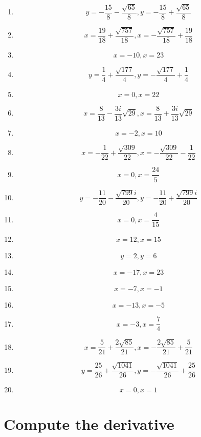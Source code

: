 \documentclass{article}
\begin{document}
        \begin{enumerate}
        \item$$y = - \frac{15}{8} - \frac{\sqrt{65}}{8}, y = - \frac{15}{8} + \frac{\sqrt{65}}{8}$$
\item$$x = \frac{19}{18} + \frac{\sqrt{757}}{18}, x = - \frac{\sqrt{757}}{18} + \frac{19}{18}$$
\item$$x = -10, x = 23$$
\item$$y = \frac{1}{4} + \frac{\sqrt{177}}{4}, y = - \frac{\sqrt{177}}{4} + \frac{1}{4}$$
\item$$x = 0, x = 22$$
\item$$x = \frac{8}{13} - \frac{3 i}{13} \sqrt{29}, x = \frac{8}{13} + \frac{3 i}{13} \sqrt{29}$$
\item$$x = -2, x = 10$$
\item$$x = - \frac{1}{22} + \frac{\sqrt{309}}{22}, x = - \frac{\sqrt{309}}{22} - \frac{1}{22}$$
\item$$x = 0, x = \frac{24}{5}$$
\item$$y = - \frac{11}{20} - \frac{\sqrt{799} i}{20}, y = - \frac{11}{20} + \frac{\sqrt{799} i}{20}$$
\item$$x = 0, x = \frac{4}{15}$$
\item$$x = 12, x = 15$$
\item$$y = 2, y = 6$$
\item$$x = -17, x = 23$$
\item$$x = -7, x = -1$$
\item$$x = -13, x = -5$$
\item$$x = -3, x = \frac{7}{4}$$
\item$$x = \frac{5}{21} + \frac{2 \sqrt{85}}{21}, x = - \frac{2 \sqrt{85}}{21} + \frac{5}{21}$$
\item$$y = \frac{25}{26} + \frac{\sqrt{1041}}{26}, y = - \frac{\sqrt{1041}}{26} + \frac{25}{26}$$
\item$$x = 0, x = 1$$
        \end{enumerate}
        

        \section{Compute the derivative}
        
\end{document}
